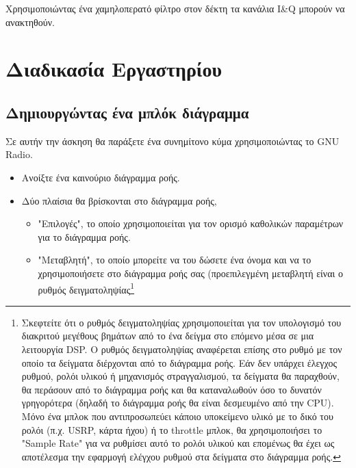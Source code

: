 \documentclass[12pt]{report}
\begin{document}
        Χρησιμοποιώντας ένα χαμηλοπερατό φίλτρο στον δέκτη τα κανάλια I\&Q μπορούν να ανακτηθούν.

    \section{\textsf{Διαδικασία Εργαστηρίου}}
        \subsection{\textsf{Δημιουργώντας ένα μπλόκ διάγραμμα}}

            Σε αυτήν την άσκηση θα παράξετε ένα συνημίτονο κύμα χρησιμοποιώντας το GNU Radio.

            \begin{itemize}
                \item Ανοίξτε ένα καινούριο διάγραμμα ροής.
                \item Δύο πλαίσια θα βρίσκονται στο διάγραμμα ροής,
                    \begin{itemize}
                        \item "Επιλογές", το οποίο χρησιμοποιείται για τον ορισμό καθολικών παραμέτρων
                        για το διάγραμμα ροής.
                        \item "Μεταβλητή", το οποίο μπορείτε να του δώσετε ένα όνομα και να 
                        το χρησιμοποιήσετε στο διάγραμμα ροής σας (προεπιλεγμένη μεταβλητή είναι 
                        ο ρυθμός δειγματοληψίας\footnote{
                            Σκεφτείτε ότι ο ρυθμός δειγματοληψίας χρησιμοποιείται για τον υπολογισμό του 
                            διακριτού μεγέθους βημάτων από το ένα δείγμα στο επόμενο μέσα σε μια λειτουργία DSP.
                            Ο ρυθμός δειγματοληψίας αναφέρεται επίσης στο ρυθμό με τον οποίο τα δείγματα
                            διέρχονται από το διάγραμμα ροής. Εάν δεν υπάρχει έλεγχος ρυθμού, ρολόι υλικού ή
                            μηχανισμός στραγγαλισμού, τα δείγματα θα παραχθούν, θα περάσουν από το διάγραμμα 
                            ροής και θα καταναλωθούν όσο το δυνατόν γρηγορότερα (δηλαδή το διάγραμμα ροής θα
                            είναι δεσμευμένο από την CPU). Μόνο ένα μπλοκ που αντιπροσωπεύει κάποιο υποκείμενο
                            υλικό με το δικό του ρολόι (π.χ. USRP, κάρτα ήχου) ή το throttle μπλοκ, θα
                            χρησιμοποιήσει το "Sample Rate" για να ρυθμίσει αυτό το ρολόι υλικού και επομένως 
                            θα έχει ως αποτέλεσμα την εφαρμογή ελέγχου ρυθμού στα δείγματα στο διάγραμμα ροής.
}
\end{itemize}
\end{itemize}
\end{document}

